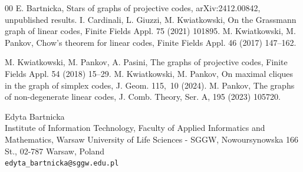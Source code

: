 \documentclass[12pt]{article}
\theoremstyle{definition}
\begin{document}
\begin{thebibliography}{00}
 E. Bartnicka, Stars of graphs of projective codes, arXiv:2412.00842, unpublished results.
 I. Cardinali, L. Giuzzi, M. Kwiatkowski, On the Grassmann graph of
linear codes, Finite Fields Appl. 75 (2021) 101895.
  M. Kwiatkowski, M. Pankov,
Chow's theorem for linear codes, Finite Fields Appl. 46 (2017) 147--162.

 M. Kwiatkowski, M. Pankov, A. Pasini, The graphs of projective codes,
Finite Fields Appl. 54 (2018) 15--29.
 M. Kwiatkowski, M. Pankov, On maximal cliques in the graph of simplex
codes,
J. Geom. 115,\ 10 (2024).
 M. Pankov, The graphs of non-degenerate linear codes, J. Comb. Theory, Ser. A,
195 (2023) 105720.
\end{thebibliography}
\footnotesize Edyta Bartnicka\\
Institute of Information Technology,
Faculty of Applied Informatics
and Mathematics,
Warsaw University of Life Sciences - SGGW,
Nowoursynowska 166 St.,
02-787 Warsaw,
Poland\\
{\tt edyta\_bartnicka@sggw.edu.pl}
\end{document}
